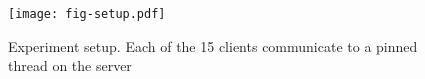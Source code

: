 \begin{figure}[t]
\texttt{[image: fig-setup.pdf]}
\caption{Experiment setup. Each of the 15 clients communicate to a pinned thread on the server}
\label{fig:setup}
\end{figure}
